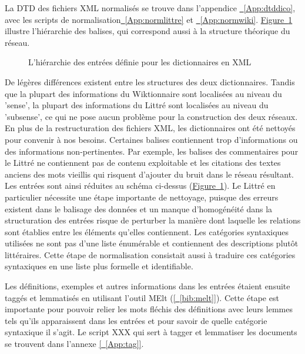 \documentclass[a4paper, 12pt]{article}
\begin{document}
La DTD des fichiers XML normalisés se trouve dans l'appendice \hyperref[App:dtddico]{~\ref*{App:dtddico}}, avec les scripts de normalisation\hyperref[App:normlittre]{~\ref*{App:normlittre}} et \hyperref[App:normwiki]{~\ref*{App:normwiki}}.
\hyperref[fig:XMLhierarchy]{Figure~\ref*{fig:XMLhierarchy}}  illustre l'hiérarchie des balises, qui correspond aussi à la structure théorique du réseau.

\begin{figure}[!ht]
\centering
\def\svgwidth{\columnwidth}
%

\caption{L'hiérarchie des entrées définie pour les dictionnaires en XML}
\label{fig:XMLhierarchy}
\end{figure}


De légères différences existent entre les structures des deux dictionnaires. Tandis que la plupart des informations du Wiktionnaire sont localisées au niveau du 'sense', la plupart des informations du Littré sont localisées au niveau du 'subsense', ce qui ne pose aucun problème pour la construction des deux réseaux.
\newline
\newline
En plus de la restructuration des fichiers XML, les dictionnaires ont été nettoyés pour convenir à nos besoins. Certaines balises contiennent trop d'informations ou des informations non-pertinentes. Par exemple, les balises des commentaires pour le Littré ne contiennent pas de contenu exploitable et les citations des textes anciens des mots vieillis qui risquent d'ajouter du bruit dans le réseau résultant. Les entrées sont ainsi réduites au schéma ci-dessus (\hyperref[fig:XMLhierarchy]{Figure~\ref*{fig:XMLhierarchy}}). Le Littré en particulier nécessite une étape importante de nettoyage, puisque des erreurs existent dans le balisage des données et un manque d'homogénéité dans la structuration des entrées risque de perturber la manière dont laquelle les relations sont établies entre les éléments qu'elles contiennent. Les catégories syntaxiques utilisées ne sont pas d'une liste énumérable et contiennent des descriptions plutôt littéraires. Cette étape de normalisation consistait aussi à traduire ces catégories syntaxiques en une liste plus formelle et identifiable.

Les définitions, exemples et autres informations dans les entrées étaient ensuite taggés et lemmatisés en utilisant l'outil MElt (\hyperref[bib:melt]{[~\ref*{bib:melt}]}). Cette étape est importante pour pouvoir relier les mots fléchis des définitions avec leurs lemmes tels qu'ils apparaissent dans les entrées et pour savoir de quelle catégorie syntaxique il s'agit. Le script XXX qui sert à tagger et lemmatiser les documents se trouvent dans l'annexe \hyperref[App:tag]{[~\ref*{App:tag}]}.
\end{document}
